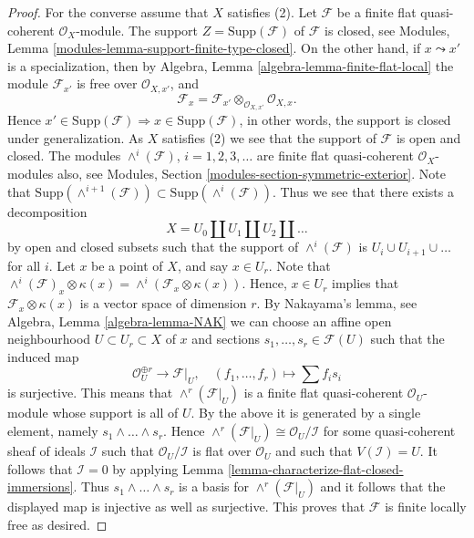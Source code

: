 \begin{proof}
\medskip\noindent
For the converse assume that $X$ satisfies (2).
Let $\mathcal{F}$ be a finite flat quasi-coherent $\mathcal{O}_X$-module.
The support $Z = \text{Supp}(\mathcal{F})$ of $\mathcal{F}$ is closed, see
Modules, Lemma \ref{modules-lemma-support-finite-type-closed}.
On the other hand, if $x \leadsto x'$ is a specialization, then by
Algebra, Lemma \ref{algebra-lemma-finite-flat-local}
the module $\mathcal{F}_{x'}$ is free over $\mathcal{O}_{X, x'}$, and
$$
\mathcal{F}_x =
\mathcal{F}_{x'} \otimes_{\mathcal{O}_{X, x'}} \mathcal{O}_{X, x}.
$$
Hence
$x' \in \text{Supp}(\mathcal{F}) \Rightarrow x \in \text{Supp}(\mathcal{F})$,
in other words, the support is closed under generalization.
As $X$ satisfies (2) we see that the support of $\mathcal{F}$
is open and closed. The modules $\wedge^i(\mathcal{F})$, $i = 1, 2, 3, \ldots$
are finite flat quasi-coherent $\mathcal{O}_X$-modules
also, see
Modules, Section \ref{modules-section-symmetric-exterior}.
Note that
$\text{Supp}(\wedge^{i + 1}(\mathcal{F})) \subset
\text{Supp}(\wedge^i(\mathcal{F}))$.
Thus we see that there exists a decomposition
$$
X = U_0 \coprod U_1 \coprod U_2 \coprod \ldots
$$
by open and closed subsets such that the support of
$\wedge^i(\mathcal{F})$ is $U_i \cup U_{i + 1} \cup \ldots$ for all $i$.
Let $x$ be a point of $X$, and say $x \in U_r$.
Note that
$\wedge^i(\mathcal{F})_x \otimes \kappa(x) =
\wedge^i(\mathcal{F}_x \otimes \kappa(x))$.
Hence, $x \in U_r$ implies that $\mathcal{F}_x \otimes \kappa(x)$
is a vector space of dimension $r$. By Nakayama's lemma, see
Algebra, Lemma \ref{algebra-lemma-NAK}
we can choose an affine open neighbourhood $U \subset U_r \subset X$
of $x$ and sections $s_1, \ldots, s_r \in \mathcal{F}(U)$ such that
the induced map
$$
\mathcal{O}_U^{\oplus r} \longrightarrow \mathcal{F}|_U, \quad
(f_1, \ldots, f_r) \longmapsto \sum f_i s_i
$$
is surjective. This means that
$\wedge^r(\mathcal{F}|_U)$ is a finite flat quasi-coherent
$\mathcal{O}_U$-module whose support is all of $U$.
By the above it is generated by a single element, namely
$s_1 \wedge \ldots \wedge s_r$. Hence
$\wedge^r(\mathcal{F}|_U) \cong \mathcal{O}_U/\mathcal{I}$
for some quasi-coherent sheaf of ideals $\mathcal{I}$
such that $\mathcal{O}_U/\mathcal{I}$ is flat over $\mathcal{O}_U$ and
such that $V(\mathcal{I}) = U$.
It follows that $\mathcal{I} = 0$ by applying
Lemma \ref{lemma-characterize-flat-closed-immersions}.
Thus $s_1 \wedge \ldots \wedge s_r$ is a basis for
$\wedge^r(\mathcal{F}|_U)$ and it follows that the displayed map is injective
as well as surjective. This proves that $\mathcal{F}$ is finite locally free
as desired.
\end{proof}






